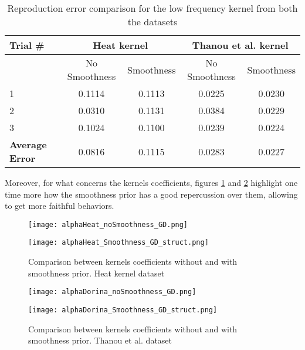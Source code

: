 \begin{table}[htbp]
  \centering
  \begin{tabular}{lcccc}
  \textbf{Trial \#} &\multicolumn{2}{c}{\textbf{Heat kernel}}&\multicolumn{2}{c}{\textbf{Thanou et al. kernel}}\\
  \toprule
  & No Smoothness & Smoothness & No Smoothness & Smoothness\\ %
  \midrule
    1 & 0.1114 & 0.1113 & 0.0225 & 0.0230\\
    2 & 0.0310 & 0.1131 & 0.0384 & 0.0229\\
    3 & 0.1024 & 0.1100 & 0.0239 & 0.0224\\
    \textbf{Average Error} & 0.0816 & 0.1115 & 0.0283 & 0.0227 \\
    \bottomrule
  \end{tabular}
  \caption{Reproduction error comparison for the low frequency kernel from both the datasets}
  \label{tab:errorGD_smoothness}
\end{table}

Moreover, for what concerns the kernels coefficients, figures \ref{fig:alphaGDHeat} and \ref{fig:alphaGDDorina} highlight one time more how the smoothness prior has a good repercussion over them, allowing to get more faithful behaviors.

\begin{figure}
  \centering
  \begin{minipage}[c]{.8\textwidth}
    \centering
    \texttt{[image: alphaHeat\_noSmoothness\_GD.png]}
  \end{minipage}
  \begin{minipage}[c]{.8\textwidth}
    \centering
    \texttt{[image: alphaHeat\_Smoothness\_GD\_struct.png]}
  \end{minipage}
  \caption{Comparison between kernels coefficients without and with smoothness prior. Heat kernel   dataset}
  \label{fig:alphaGDHeat}
\end{figure}

\begin{figure}
  \centering
  \begin{minipage}[c]{.8\textwidth}
    \centering
    \texttt{[image: alphaDorina\_noSmoothness\_GD.png]}
  \end{minipage}
  \begin{minipage}[c]{.8\textwidth}
    \centering
    \texttt{[image: alphaDorina\_Smoothness\_GD\_struct.png]}
  \end{minipage}
  \caption{Comparison between kernels coefficients without and with smoothness prior. Thanou et al.   dataset}
  \label{fig:alphaGDDorina}
\end{figure}

